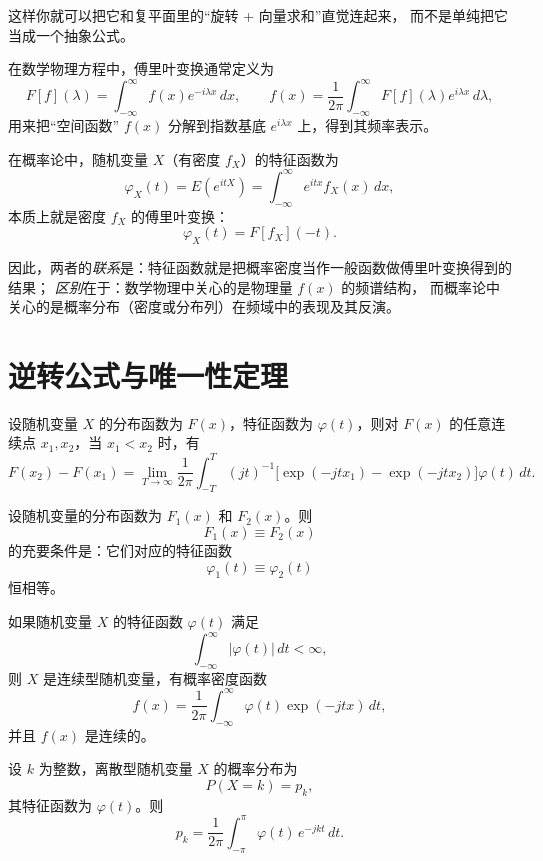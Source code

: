 这样你就可以把它和复平面里的“旋转 + 向量求和”直觉连起来，
而不是单纯把它当成一个抽象公式。
\begin{remark}[概率论与数学物理中的傅里叶变换之联系与区别]
在数学物理方程中，傅里叶变换通常定义为
\[
F[f](\lambda)=\int_{-\infty}^{\infty} f(x)e^{-i\lambda x}\,dx,\qquad
f(x)=\frac{1}{2\pi}\int_{-\infty}^{\infty}F[f](\lambda)e^{i\lambda x}\,d\lambda,
\]
用来把“空间函数” $f(x)$ 分解到指数基底 $e^{i\lambda x}$ 上，得到其频率表示。

在概率论中，随机变量 $X$（有密度 $f_X$）的特征函数为
\[
\varphi_X(t)=E(e^{itX})
=\int_{-\infty}^{\infty} e^{itx} f_X(x)\,dx,
\]
本质上就是密度 $f_X$ 的傅里叶变换：
\[
\varphi_X(t)=F[f_X](-t).
\]

因此，两者的\emph{联系}是：特征函数就是把概率密度当作一般函数做傅里叶变换得到的结果；
\emph{区别}在于：数学物理中关心的是物理量 $f(x)$ 的频谱结构，
而概率论中关心的是概率分布（密度或分布列）在频域中的表现及其反演。
\end{remark}
\section{逆转公式与唯一性定理}
\begin{lemma}[随机变量的分布函数可以由其特征函数通过一个反演积分公式唯一恢复]
设随机变量 $X$ 的分布函数为 $F(x)$，特征函数为 $\varphi(t)$，则对 $F(x)$ 的任意连续点 $x_1,x_2$，当 $x_1<x_2$ 时，有
\[
F(x_2)-F(x_1)
=
\lim_{T\to\infty}
\frac{1}{2\pi}
\int_{-T}^{T}
(jt)^{-1}
\bigl[
\exp(-jtx_1)-\exp(-jtx_2)
\bigr]
\varphi(t)\,dt.
\tag{4.2.1}
\]
\end{lemma}
\begin{theorem}[分布函数相同的前提是特征函数恒等]
设随机变量的分布函数为 $F_1(x)$ 和 $F_2(x)$。则
\[
F_1(x) \equiv F_2(x)
\]
的充要条件是：它们对应的特征函数
\[
\varphi_1(t) \equiv \varphi_2(t)
\]
恒相等。
\end{theorem}
\begin{theorem}
如果随机变量 $X$ 的特征函数 $\varphi(t)$ 满足
\[
\int_{-\infty}^{\infty} |\varphi(t)|\,dt < \infty,
\]
则 $X$ 是连续型随机变量，有概率密度函数
\[
f(x)=\frac{1}{2\pi}\int_{-\infty}^{\infty} \varphi(t)\exp(-jtx)\,dt,
\]
并且 $f(x)$ 是连续的。
\end{theorem}
\begin{theorem}
设 $k$ 为整数，离散型随机变量 $X$ 的概率分布为
\[
P(X = k) = p_k ,
\]
其特征函数为 $\varphi(t)$。则
\[
p_k = \frac{1}{2\pi} \int_{-\pi}^{\pi} \varphi(t)\, e^{-jkt}\, dt.
\tag{4.2.3}
\]
\end{theorem}




